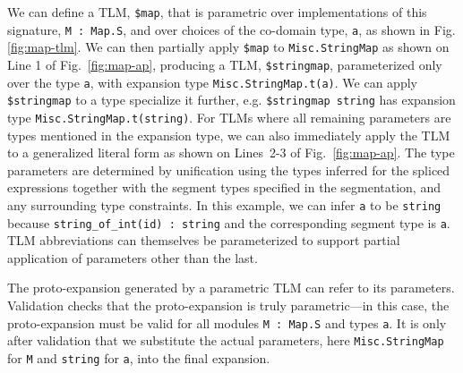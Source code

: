 \documentclass[acmsmall]{acmart}
\newcommand{\li}[1]{\lstinline[basicstyle=\ttfamily\fontsize{9pt}{1em}\selectfont]{#1}}
\begin{document}
We can define a TLM, \li{$map}, that is parametric over implementations of this signature, \li{M : Map.S}, and over choices of the co-domain type, \li{a}, as shown in Fig. \ref{fig:map-tlm}. We can then partially apply \li{$map} to \li{Misc.StringMap} as shown on Line 1 of Fig.~\ref{fig:map-ap}, producing a TLM, \li{$stringmap},  parameterized only over the type \li{a}, with expansion type \li{Misc.StringMap.t(a)}. We can apply \li{$stringmap} to a type specialize it further, e.g. \li{$stringmap string} has expansion type \li{Misc.StringMap.t(string)}.  For TLMs where all remaining parameters are types mentioned in the expansion type, we can also immediately apply the TLM to a generalized literal form as shown on Lines~2-3 of Fig.~\ref{fig:map-ap}. The type parameters are determined by unification using the types inferred for the spliced expressions together with the segment types specified in the segmentation, and any surrounding type constraints. In this example, we can infer \li{a} to be \li{string} because \li{string_of_int(id) : string} and the corresponding segment type is \li{a}. TLM abbreviations can themselves be parameterized to support partial application of parameters other than the last.


The proto-expansion generated by a parametric TLM can refer to its parameters. Validation checks that the proto-expansion is truly parametric---in this case, the proto-expansion must be valid for all modules \li{M : Map.S} and types \li{a}. It is only after validation that we substitute the actual parameters, here \li{Misc.StringMap} for \li{M} and \li{string} for \li{a}, into the final expansion. 

\end{document}
